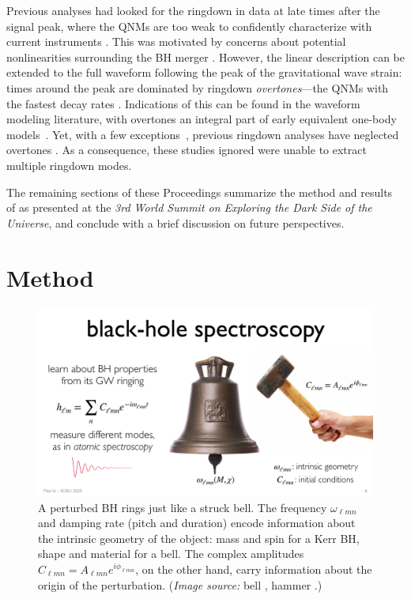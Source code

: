 \documentclass[letterpaper]{article}
\begin{document}
Previous analyses had looked for the ringdown in data at late times after the signal peak, where the QNMs are too weak to confidently characterize with current instruments \cite{gw150914_tgr,Nagar:2016iwa,Cabero:2017avf,Thrane:2017lqn,Brito:2018rfr,Carullo:2018sfu,Carullo:2019flw}.
This was motivated by concerns about potential nonlinearities surrounding the BH merger \cite{Gossan:2011ha, Kamaretsos:2011um, London:2014cma, Cabero:2017avf,Thrane:2017lqn, Carullo:2018sfu, Carullo:2019flw}.
%
However, the linear description can be extended to the full waveform following the peak of the gravitational wave strain: times around the peak are dominated by ringdown \emph{overtones}---the QNMs with the fastest decay rates \cite{Giesler:2019uxc,Buonanno:2006ui}.
Indications of this can be found in the waveform modeling literature, with overtones an integral part of early equivalent one-body models~\cite{Pan:2013rra,Taracchini:2013rva,Babak:2016tgq}.
Yet, with a few exceptions~\cite{Baibhav:2017jhs,Brito:2018rfr}, previous ringdown analyses have neglected overtones \cite{Gossan:2011ha, gw150914_tgr,Bhagwat:2016ntk,Nagar:2016iwa,Cabero:2017avf,Thrane:2017lqn,Carullo:2018sfu,Carullo:2019flw}.
As a consequence, these studies ignored were unable to extract multiple ringdown modes.

The remaining sections of these Proceedings summarize the method and results of \cite{Isi:2019aib} as presented at the \emph{3rd World Summit on Exploring the Dark Side of the Universe}, and conclude with a brief discussion on future perspectives.

\section{Method}

\begin{figure}[bt]
\centering
\includegraphics[width=0.5\columnwidth]{bell}
\caption{
A perturbed BH rings just like a struck bell.
The frequency $\omega_{\ell m n}$ and damping rate (pitch and duration) encode information about the intrinsic geometry of the object: mass and spin for a Kerr BH, shape and material for a bell.
The complex amplitudes $C_{\ell m n} = A_{\ell m n} e^{i\phi_{\ell m n}}$, on the other hand, carry information about the origin of the perturbation.
(\emph{Image source:} bell \cite{bell}, hammer \cite{hammer}.)
}
\label{fig:bell}
\end{figure}
\end{document}
